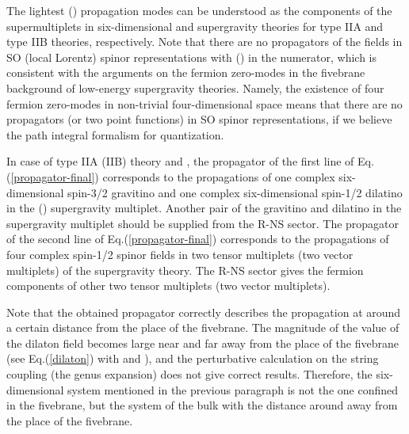 \documentclass[a4paper,prd,preprint]{revtex4}
\begin{document}
The lightest (\coordHE{}) propagation modes can be understood
 as the components of the supermultiplets
 in six-dimensional \coordHE{} and \coordHE{} supergravity theories
 for type IIA and type IIB theories, respectively.
Note that there are no propagators of the fields
 in SO\coordHE{} (local Lorentz) spinor representations
 with \myHighlight{$\Gamma^\mu$}\coordHE{} (\coordHE{}) in the numerator,
 which is consistent with the arguments on the fermion zero-modes
 in the fivebrane background of low-energy supergravity theories.
Namely,
 the existence of four fermion zero-modes
 in non-trivial four-dimensional space \coordHE{} means
 that there are no propagators (or two point functions)
 in SO\coordHE{} spinor representations,
 if we believe the path integral formalism for quantization.

In case of type IIA (IIB) theory and \coordHE{},
 the propagator of the first line of Eq.(\ref{propagator-final})
 corresponds to the propagations of
 one complex six-dimensional spin-3/2 gravitino
 and one complex six-dimensional spin-1/2 dilatino
 in the \coordHE{} (\coordHE{}) supergravity multiplet.
Another pair of the gravitino and dilatino
 in the supergravity multiplet
 should be supplied from the R-NS sector.
The propagator of the second line of Eq.(\ref{propagator-final})
 corresponds to the propagations of four complex spin-1/2 spinor fields
 in two \coordHE{} tensor multiplets (two \coordHE{} vector multiplets)
 of the supergravity theory.
The R-NS sector gives
 the fermion components of other two \coordHE{} tensor multiplets
 (two \coordHE{} vector multiplets).

Note that the obtained propagator
 correctly describes the propagation
 at around a certain distance from the place of the fivebrane.
The magnitude of the value of the dilaton field
 becomes large near and far away from the place of the fivebrane
 (see Eq.(\ref{dilaton}) with \coordHE{} and \coordHE{}),
 and the perturbative calculation on the string coupling
 (the genus expansion) does not give correct results.
Therefore,
 the six-dimensional system mentioned in the previous paragraph
 is not the one confined in the fivebrane,
 but the system of the bulk with the distance around
 \coordHE{} away from the place of the fivebrane.
\end{document}
